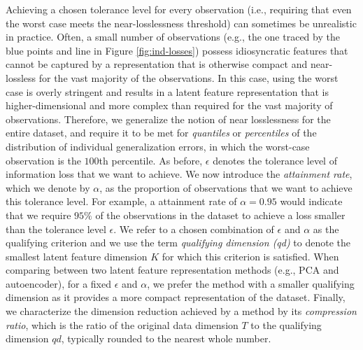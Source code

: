 Achieving a chosen tolerance level for every observation (i.e., requiring that even the worst case meets the near-losslessness threshold) can sometimes be unrealistic in practice.
Often, a small number of observations (e.g., the one traced by the blue points and line in Figure \ref{fig:ind-losses}) possess idiosyncratic features that cannot be captured by a representation that is otherwise compact and near-lossless for the vast majority of the observations.
In this case, using the worst case is overly stringent and results in a latent feature representation that is higher-dimensional and more complex than required for the vast majority of observations.
Therefore, we generalize the notion of near losslessness for the entire dataset, and require it to be met for \emph{quantiles} or \emph{percentiles} of the distribution of individual generalization errors, in which the worst-case observation is the $100$th percentile. 
As before, $\epsilon$ denotes the tolerance level of information loss that we want to achieve.
We now introduce the \emph{attainment rate}, which we denote by $\alpha$, as the proportion of observations that we want to achieve this tolerance level.
For example, a attainment rate of $\alpha = 0.95$ would indicate that we require $95\%$ of the observations in the dataset to achieve a loss smaller than the tolerance level $\epsilon$.
We refer to a chosen combination of $\epsilon$ and $\alpha$ as the qualifying criterion and we use the term \emph{qualifying dimension (qd)} to denote the smallest latent feature dimension $K$ for which this criterion is satisfied.
When comparing between two latent feature representation methods (e.g., PCA and autoencoder), for a fixed $\epsilon$ and $\alpha$, we prefer the method with a smaller qualifying dimension as it provides a more compact representation of the dataset.
Finally, we characterize the dimension reduction achieved by a method by its \emph{compression ratio}, which is the ratio of the original data dimension $T$ to the qualifying dimension $qd$, typically rounded to the nearest whole number.

